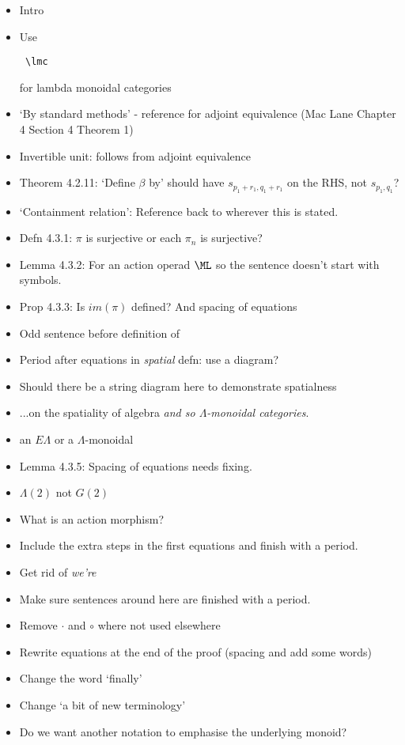 \documentclass{amsart}
\begin{document}
\begin{itemize}
\item Intro
\item Use \begin{verbatim} \lmc \end{verbatim} for lambda monoidal categories
\item `By standard methods' - reference for adjoint equivalence (Mac Lane Chapter 4 Section 4 Theorem 1)
\item Invertible unit: follows from adjoint equivalence
\item Theorem 4.2.11: `Define $\beta$ by' should have $s_{p_1+r_1,q_1+r_1}$ on the RHS, not $s_{p_1,q_1}$?
\item `Containment relation': Reference back to wherever this is stated.
\item Defn 4.3.1: $\pi$ is surjective or each $\pi_n$ is surjective?
\item Lemma 4.3.2: For an action operad $\ML$ so the sentence doesn't start with symbols.
\item Prop 4.3.3: Is $im(\pi)$ defined? And spacing of equations
\item Odd sentence before definition of 
\item Period after equations in \textit{spatial} defn: use a diagram?
\item Should there be a string diagram here to demonstrate spatialness
\item ...on the spatiality of algebra \textit{and so $\Lambda$-monoidal categories}.
\item an $E\Lambda$ or a $\Lambda$-monoidal
\item Lemma 4.3.5: Spacing of equations needs fixing.
\item $\Lambda(2)$ not $G(2)$
\item What is an action morphism?
\item Include the extra steps in the first equations and finish with a period.
\item Get rid of \textit{we're}
\item Make sure sentences around here are finished with a period.
\item Remove $\cdot$ and $\circ$ where not used elsewhere
\item Rewrite equations at the end of the proof (spacing and add some words)
\item Change the word `finally'
\item Change `a bit of new terminology'
\item Do we want another notation to emphasise the underlying monoid?

\end{itemize}
\end{document}
